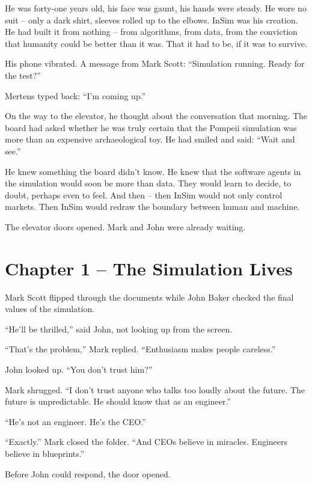 \documentclass[
]{article}
\begin{document}
He was forty-one years old, his face was gaunt, his hands were steady. He wore no suit -- only a dark shirt, sleeves rolled up to the elbows. InSim was his creation. He had built it from nothing -- from algorithms, from data, from the conviction that humanity could be better than it was. That it had to be, if it was to survive.

His phone vibrated. A message from Mark Scott: \enquote{Simulation running. Ready for the test?}

Mertens typed back: \enquote{I'm coming up.}

On the way to the elevator, he thought about the conversation that morning. The board had asked whether he was truly certain that the Pompeii simulation was more than an expensive archaeological toy. He had smiled and said: \enquote{Wait and see.}

He knew something the board didn't know. He knew that the software agents in the simulation would soon be more than data. They would learn to decide, to doubt, perhaps even to feel. And then -- then InSim would not only control markets. Then InSim would redraw the boundary between human and machine.

The elevator doors opened. Mark and John were already waiting.

\newpage

\section{Chapter 1 -- The Simulation Lives}

Mark Scott flipped through the documents while John Baker checked the final values of the simulation.

\enquote{He'll be thrilled,} said John, not looking up from the screen.

\enquote{That's the problem,} Mark replied. \enquote{Enthusiasm makes people careless.}

John looked up. \enquote{You don't trust him?}

Mark shrugged. \enquote{I don't trust anyone who talks too loudly about the future. The future is unpredictable. He should know that as an engineer.}

\enquote{He's not an engineer. He's the CEO.}

\enquote{Exactly.} Mark closed the folder. \enquote{And CEOs believe in miracles. Engineers believe in blueprints.}

Before John could respond, the door opened.
\end{document}
